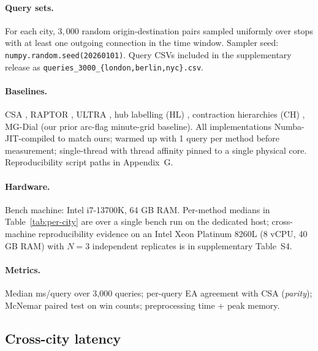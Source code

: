 \documentclass[letterpaper]{article}
\theoremstyle{definition}
\theoremstyle{plain}
\begin{document}
\paragraph{Query sets.} For each city, $3{,}000$ random origin-destination
pairs sampled uniformly over stops with at least one outgoing connection in
the time window. Sampler seed: \texttt{numpy.random.seed(20260101)}.
Query CSVs included in the supplementary release as
\texttt{queries\_3000\_\{london,berlin,nyc\}.csv}.

\paragraph{Baselines.} CSA \cite{dibbelt2018csa}, RAPTOR
\cite{delling2015raptor}, ULTRA \cite{baum2019ultra}, hub labelling (HL)
\cite{delling2014hublabel}, contraction hierarchies (CH)
\cite{geisberger2008ch}, MG-Dial (our prior arc-flag minute-grid baseline).
All implementations Numba-JIT-compiled to match ours; warmed up with
1 query per method before measurement; single-thread with thread affinity
pinned to a single physical core. Reproducibility script paths in
Appendix~G.

\paragraph{Hardware.}
Bench machine: Intel i7-13700K, 64 GB RAM. Per-method medians in
Table~\ref{tab:per-city} are over a single bench run on the dedicated
host; cross-machine reproducibility evidence on an Intel Xeon
Platinum 8260L (8 vCPU, 40 GB RAM) with $N\!=\!3$ independent replicates
is in supplementary Table~S4.

\paragraph{Metrics.} Median ms/query over 3{,}000 queries; per-query EA
agreement with CSA (\emph{parity}); McNemar paired test on win counts;
preprocessing time + peak memory.

\subsection{Cross-city latency}
\end{document}
